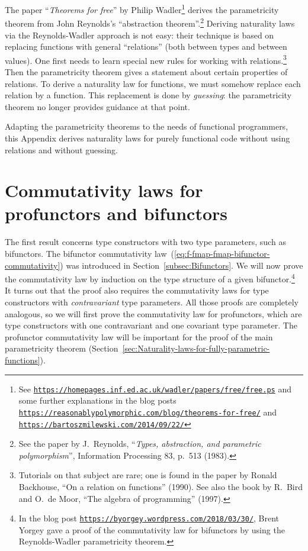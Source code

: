\noindent {}The paper ``\emph{Theorems for free}''
by Philip Wadler\footnote{See \texttt{\href{https://homepages.inf.ed.ac.uk/wadler/papers/free/free.ps}{https://homepages.inf.ed.ac.uk/wadler/papers/free/free.ps}}
and some further explanations in the blog posts \texttt{\href{https://reasonablypolymorphic.com/blog/theorems-for-free/}{https://reasonablypolymorphic.com/blog/theorems-for-free/}}
and \texttt{\href{https://bartoszmilewski.com/2014/09/22/}{https://bartoszmilewski.com/2014/09/22/}}} derives the parametricity theorem from John Reynolds's ``abstraction
theorem''.\footnote{See the paper by J.~Reynolds, ``\emph{Types, abstraction, and parametric
polymorphism}'', Information Processing 83, p.~513 (1983).} Deriving naturality laws via the Reynolds-Wadler approach is not
easy: their technique is based on replacing functions with general
``relations'' (both between types and between values). One first
needs to learn special new rules for working with relations.\footnote{Tutorials on that subject are rare; one is found in the paper by Ronald
Backhouse, ``On a relation on functions'' (1990). See also the book
by R.~Bird and O.~de Moor, ``The algebra of programming'' (1997).} Then the parametricity theorem gives a statement about certain properties
of relations. To derive a naturality law for functions, we must somehow
replace each relation by a function. This replacement is done by \emph{guessing}:
the parametricity theorem no longer provides guidance at that point.

Adapting the parametricity theorems to the needs of functional programmers,
this Appendix derives naturality laws for purely functional code without
using relations and without guessing.

\section{Commutativity laws for profunctors and bifunctors\label{sec:Commutativity-laws-for-type-constructors}}

The first result concerns type constructors with two type parameters,
such as bifunctors. The bifunctor commutativity law~(\ref{eq:f-fmap-fmap-bifunctor-commutativity})
was introduced in Section~\ref{subsec:Bifunctors}. We will now prove
the commutativity law by induction on the type structure of a given
bifunctor.\footnote{In the blog post \texttt{\href{https://byorgey.wordpress.com/2018/03/30/}{https://byorgey.wordpress.com/2018/03/30/}},
Brent Yorgey gave a proof of the commutativity
law for bifunctors by using the Reynolds-Wadler parametricity
theorem. } It turns out that the proof also requires the commutativity laws
for type constructors with \emph{contravariant} type parameters. All
those proofs are completely analogous, so we will first prove the
commutativity law for profunctors, which are type constructors with
one contravariant and one covariant type parameter. The profunctor
commutativity law will be important for the proof of the main parametricity
theorem (Section~\ref{sec:Naturality-laws-for-fully-parametric-functions}). 

